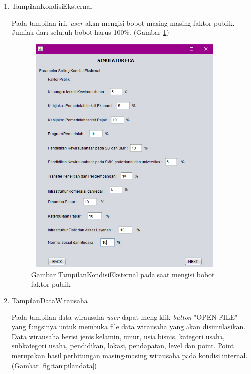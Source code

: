 \begin{enumerate}
	\item TampilanKondisiEksternal
	
	Pada tampilan ini, \textit{user} akan mengisi bobot masing-masing faktor publik. Jumlah dari seluruh bobot harus 100\%. (Gambar \ref{fig:tampilaneksternal1})
	
		\begin{figure} [H]
	\centering  
	\includegraphics[width=10cm, height=12cm]{tampilanImplementasiEksternal} 
		\caption[Gambar TampilanKetetanggaan]{Gambar TampilanKondisiEksternal pada saat mengisi bobot faktor publik}
	\label{fig:tampilaneksternal1} 
\end{figure}

	\item TampilanDataWirausaha
	
 	Pada tampilan data wirausaha \textit{user} dapat meng-klik \textit{button} "OPEN FILE" yang fungsinya untuk membuka file data wirausaha yang akan disimulasikan. Data wirausaha berisi jenis kelamin, umur, usia bisnis, kategori usaha, subkategori usaha, pendidikan, lokasi, pendapatan, level dan point. Point merupakan hasil perhitungan masing-masing wirausaha pada kondisi internal. (Gambar \ref{fig:tampilandata})
	

\end{enumerate}
